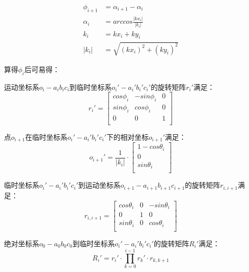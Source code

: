 \begin{align}
\phi_{i+1} &= \alpha_{i+1} - \alpha_i \\
\alpha_i &= arccos\frac{|kx_i|}{|k_i|} \\
k_i &= kx_i + ky_i \\
|k_i| &= \sqrt{(kx_i)^2 + (ky_i)^2}
\end{align}

算得$\phi_i$后可易得：

运动坐标系$o_i-a_ib_ic_i$到临时坐标系$o_i'-a_i'b_i'c_i'$的旋转矩阵$r_i'$满足：
    \begin{equation}
    r_i' = \left[
            \begin{matrix}
            cos\phi_i & -sin\phi_i & 0\\
            sin\phi_i & cos\phi_i & 0\\
            0 & 0 & 1\\
            \end{matrix}
        \right]
    \end{equation}
    
点$o_{i+1}$在临时坐标系$o_i'-a_i'b_i'c_i'$下的相对坐标$o_{i+1}'$满足：
    \begin{equation}
    o_{i+1}' = \frac{1}{|k_i|} \cdot \left[
      \begin{matrix}
    	1 - cos\theta_i\\
    	0 \\
      sin\theta_i\\
      \end{matrix}
    \right]
    \end{equation}
    
临时坐标系$o_i'-a_i'b_i'c_i'$到运动坐标系$o_{i+1}-a_{i+1}b_{i+1}c_{i+1}$的旋转矩阵$r_{i, i+1}$满足：
    \begin{equation}
    r_{i, i+1} = \left[
      \begin{matrix}
      cos \theta_i & 0 & -sin \theta_i\\
      0 &1 & 0\\
      sin \theta_i & 0 & cos \theta_i\\
      \end{matrix}
    \right]
    \end{equation}

绝对坐标系$o_0-a_0b_0c_0$到临时坐标系$o_i'-a_i'b_i'c_i'$的旋转矩阵$R_i'$满足：
    \begin{equation}
    R_i' = r_i' \cdot \prod_{k = 0}^{i-1} r_k' \cdot r_{k, k+1}
    \end{equation}
    
